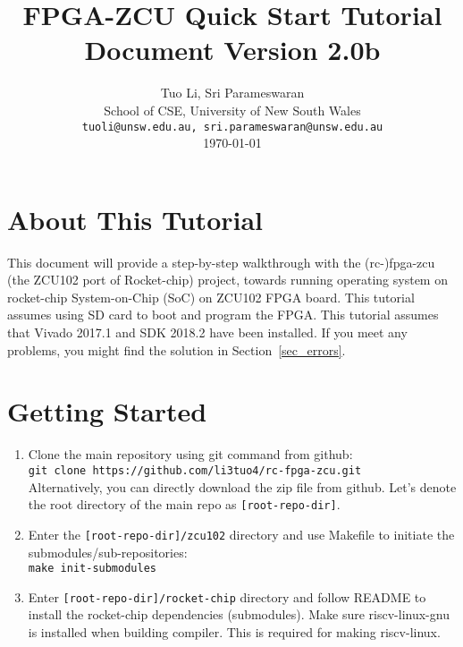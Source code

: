 \documentclass[a4paper,11pt]{article}
\begin{document}
\title{\vspace{-0.7in}\Large {\bf FPGA-ZCU Quick Start Tutorial} \\
Document Version 2.0b
  \vspace{-0.1in}}

\author{Tuo Li, Sri Parameswaran\\
  School of CSE, University of New South Wales \\
  {\tt tuoli@unsw.edu.au, sri.parameswaran@unsw.edu.au} \\
  \today
}
\date{} 

\newpage

\maketitle

\newpage

\section*{About This Tutorial}
This document will provide a step-by-step walkthrough with the (rc-)fpga-zcu (the ZCU102 port of Rocket-chip) project, towards running operating system on rocket-chip System-on-Chip (SoC) on ZCU102 FPGA board. 
This tutorial assumes using SD card to boot and program the FPGA.
This tutorial assumes that Vivado 2017.1 and SDK 2018.2 have been installed. 
If you meet any problems, you might find the solution in Section~\ref{sec_errors}.
\newpage

\section{Getting Started}

\newcommand{\rootdir}{[root-repo-dir]}

\begin{enumerate}
\item Clone the main repository using git command from github:\\
 {\tt git clone https://github.com/li3tuo4/rc-fpga-zcu.git}\\
 Alternatively, you can directly download the zip file from github.
 Let's denote the root directory of the main repo as \texttt{\rootdir}.
\item Enter the {\tt \rootdir/zcu102} directory and use Makefile to initiate the submodules/sub-repositories:\\
 {\tt make init-submodules}
 \item Enter {\tt \rootdir/rocket-chip} directory and follow README to install the rocket-chip dependencies (submodules). Make sure riscv-linux-gnu is installed when building compiler. This is required for making riscv-linux.
\end{enumerate}
\end{document}
